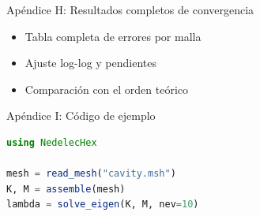 \documentclass[aspectratio=169,11pt]{beamer}
\begin{document}
\begin{frame}{Apéndice H: Resultados completos de convergencia}
  \begin{itemize}
    \item Tabla completa de errores por malla
    \item Ajuste log-log y pendientes
    \item Comparación con el orden teórico
  \end{itemize}
\end{frame}

\begin{frame}[fragile]{Apéndice I: Código de ejemplo}
  \begin{lstlisting}[language=Julia]
using NedelecHex

mesh = read_mesh("cavity.msh")
K, M = assemble(mesh)
lambda = solve_eigen(K, M, nev=10)
  \end{lstlisting}
\end{frame}

\end{document}
